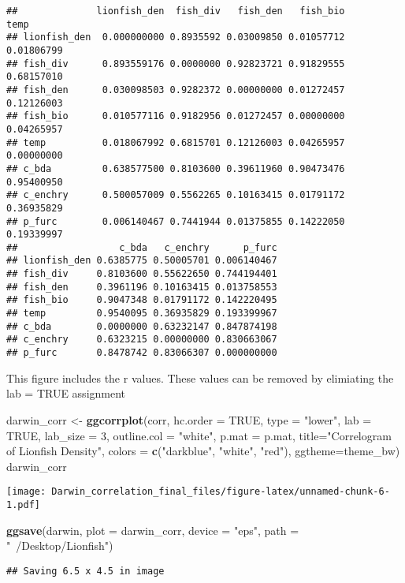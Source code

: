 \documentclass[]{article}
\newenvironment{Shaded}{\begin{snugshade}}{\end{snugshade}}
\newcommand{\KeywordTok}[1]{\textcolor[rgb]{0.13,0.29,0.53}{\textbf{#1}}}
\newcommand{\DataTypeTok}[1]{\textcolor[rgb]{0.13,0.29,0.53}{#1}}
\newcommand{\DecValTok}[1]{\textcolor[rgb]{0.00,0.00,0.81}{#1}}
\newcommand{\StringTok}[1]{\textcolor[rgb]{0.31,0.60,0.02}{#1}}
\newcommand{\OtherTok}[1]{\textcolor[rgb]{0.56,0.35,0.01}{#1}}
\newcommand{\NormalTok}[1]{#1}
\begin{document}
\begin{verbatim}
##              lionfish_den  fish_div   fish_den   fish_bio       temp
## lionfish_den  0.000000000 0.8935592 0.03009850 0.01057712 0.01806799
## fish_div      0.893559176 0.0000000 0.92823721 0.91829555 0.68157010
## fish_den      0.030098503 0.9282372 0.00000000 0.01272457 0.12126003
## fish_bio      0.010577116 0.9182956 0.01272457 0.00000000 0.04265957
## temp          0.018067992 0.6815701 0.12126003 0.04265957 0.00000000
## c_bda         0.638577500 0.8103600 0.39611960 0.90473476 0.95400950
## c_enchry      0.500057009 0.5562265 0.10163415 0.01791172 0.36935829
## p_furc        0.006140467 0.7441944 0.01375855 0.14222050 0.19339997
##                  c_bda   c_enchry      p_furc
## lionfish_den 0.6385775 0.50005701 0.006140467
## fish_div     0.8103600 0.55622650 0.744194401
## fish_den     0.3961196 0.10163415 0.013758553
## fish_bio     0.9047348 0.01791172 0.142220495
## temp         0.9540095 0.36935829 0.193399967
## c_bda        0.0000000 0.63232147 0.847874198
## c_enchry     0.6323215 0.00000000 0.830663067
## p_furc       0.8478742 0.83066307 0.000000000
\end{verbatim}

This figure includes the r values. These values can be removed by
elimiating the lab = TRUE assignment

\begin{Shaded}
\begin{Highlighting}[]
\NormalTok{darwin_corr <-}\StringTok{ }\KeywordTok{ggcorrplot}\NormalTok{(corr, }\DataTypeTok{hc.order =} \OtherTok{TRUE}\NormalTok{, }
           \DataTypeTok{type =} \StringTok{"lower"}\NormalTok{, }
           \DataTypeTok{lab =} \OtherTok{TRUE}\NormalTok{, }
           \DataTypeTok{lab_size =} \DecValTok{3}\NormalTok{, }\DataTypeTok{outline.col =} \StringTok{"white"}\NormalTok{,}
           \DataTypeTok{p.mat =}\NormalTok{ p.mat,}
           \DataTypeTok{title=}\StringTok{"Correlogram of Lionfish Density"}\NormalTok{, }
           \DataTypeTok{colors =} \KeywordTok{c}\NormalTok{(}\StringTok{"darkblue"}\NormalTok{, }\StringTok{"white"}\NormalTok{, }\StringTok{"red"}\NormalTok{),}
           \DataTypeTok{ggtheme=}\NormalTok{theme_bw)}
\NormalTok{darwin_corr}
\end{Highlighting}
\end{Shaded}

\texttt{[image: Darwin\_correlation\_final\_files/figure-latex/unnamed-chunk-6-1.pdf]}

\begin{Shaded}
\begin{Highlighting}[]
\KeywordTok{ggsave}\NormalTok{(darwin, }\DataTypeTok{plot =}\NormalTok{ darwin_corr, }\DataTypeTok{device =} \StringTok{"eps"}\NormalTok{, }\DataTypeTok{path =} \StringTok{"~/Desktop/Lionfish"}\NormalTok{)}
\end{Highlighting}
\end{Shaded}

\begin{verbatim}
## Saving 6.5 x 4.5 in image
\end{verbatim}
\end{document}
